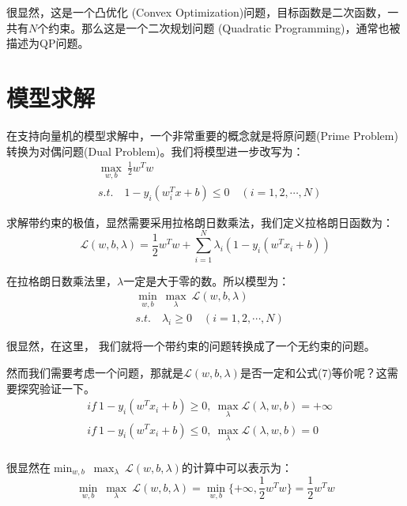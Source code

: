 \documentclass[a4paper]{article}
\begin{document}
很显然，这是一个凸优化 (Convex Optimization)问题，目标函数是二次函数，一共有$N$个约束。那么这是一个二次规划问题 (Quadratic Programming)，通常也被描述为QP问题。

\section{模型求解}
在支持向量机的模型求解中，一个非常重要的概念就是将原问题(Prime Problem)转换为对偶问题(Dual Problem)。我们将模型进一步改写为：
\begin{equation}
    \begin{split}
        & \max_{w,b} \ \frac{1}{2} w^Tw \\
        & s.t. \quad 1-y_i(w^T_ix+b)\leq 0 \quad (i = 1,2,\cdots,N)
    \end{split}
\end{equation}

求解带约束的极值，显然需要采用拉格朗日数乘法，我们定义拉格朗日函数为：
\begin{equation}
    \mathcal{L}(w,b,\lambda) = \frac{1}{2}w^Tw + \sum_{i=1}^N\lambda_i(1-y_i(w^Tx_i+b))
\end{equation}

在拉格朗日数乘法里，$\lambda$一定是大于零的数。所以模型为：
\begin{equation}
    \begin{split}
        & \min_{w,b} \ \max_\lambda \ \mathcal{L}(w,b,\lambda) \\
        & s.t. \quad \lambda_i \geq 0 \quad (i = 1,2,\cdots,N)
    \end{split}
\end{equation}

很显然，在这里，{\color{red} 我们就将一个带约束的问题转换成了一个无约束的问题。}

然而我们需要考虑一个问题，那就是$\mathcal{L}(w,b,\lambda)$是否一定和公式(7)等价呢？这需要探究验证一下。
\begin{equation}
    \begin{split}
        & if \ 1-y_i(w^Tx_i+b)\geq 0,\ \max_\lambda\mathcal{L}(\lambda,w,b)=+\infty \\
        & if \ 1-y_i(w^Tx_i+b)\leq 0,\ \max_\lambda\mathcal{L}(\lambda,w,b)=0 \\
    \end{split}
\end{equation}

很显然在$\min_{w,b} \ \max_\lambda \ \mathcal{L}(w,b,\lambda)$的计算中可以表示为：
\begin{equation}
    \min_{w,b} \ \max_\lambda \ \mathcal{L}(w,b,\lambda) = \min_{w,b}\{ +\infty,\frac{1}{2}w^Tw \} = \frac{1}{2}w^Tw
\end{equation}
\end{document}

